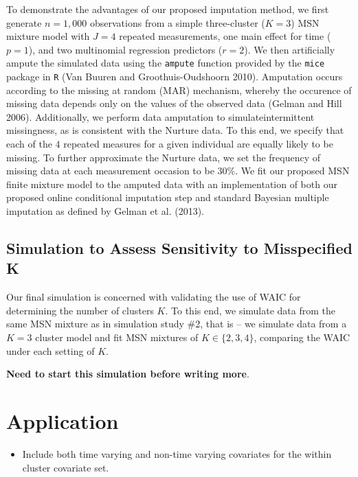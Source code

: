 \documentclass[useAMS,referee]{biom}
\begin{document}
To demonstrate the advantages of our proposed imputation method, we first generate $n = 1,000$ observations from a simple three-cluster ($K = 3$) MSN mixture model with $J = 4$ repeated measurements, one main effect for time ($p = 1$), and two multinomial regression predictors ($r = 2$). We then artificially ampute the simulated data using the \texttt{ampute} function provided by the \texttt{mice} package in \texttt{R} (Van Buuren and Groothuis-Oudshoorn 2010). Amputation occurs according to the missing at random (MAR) mechanism, whereby the occurence of missing data depends only on the values of the observed data (Gelman and Hill 2006). Additionally, we perform data amputation to simulateintermittent missingness, as is consistent with the Nurture data. To this end, we specify that each of the $4$ repeated measures for a given individual are equally likely to be missing.  To further approximate the Nurture data, we set the frequency of missing data at each measurement occasion to be 30\%. We fit our proposed MSN finite mixture model to the amputed data with an implementation of both our proposed online conditional imputation step and standard Bayesian multiple imputation as defined by Gelman et al. (2013).



\subsection{Simulation to Assess Sensitivity to Misspecified K}

Our final simulation is concerned with validating the use of WAIC for determining the number of clusters $K$. To this end, we simulate data from the same MSN mixture as in simulation study \#2, that is -- we simulate data from a $K = 3$ cluster model and fit MSN mixtures of $K \in \{2,3,4\}$, comparing the WAIC under each setting of $K$.

\textbf{Need to start this simulation before writing more}.

\newpage

\section{Application}
\label{s:app}

\begin{itemize}

\item Include both time varying and non-time varying covariates for the within cluster covariate set. 

\end{itemize}
\end{document}
